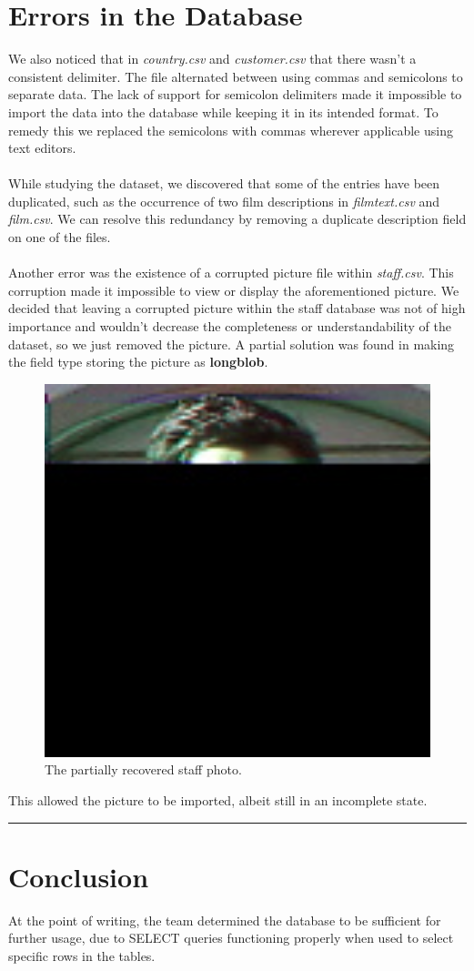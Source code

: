 \documentclass{article}
\begin{document}
\section{Errors in the Database}
	We also noticed that in \emph{country.csv} and \emph{customer.csv} that there wasn’t a consistent delimiter. The file alternated between using commas 
	and semicolons to separate data. The lack of support for semicolon delimiters made it impossible to import the data into the database while keeping it in its intended format. 
	To remedy this we replaced the semicolons with commas wherever applicable using text editors.
	\\\\
	While studying the dataset, we discovered that some of the entries have been duplicated, such as the occurrence of two film descriptions in \emph{film\textunderscore text.csv} and \emph{film.csv}. We can resolve this redundancy by removing a duplicate description field on one of the files.
	\\\\
	Another error was the existence of a corrupted picture file within \emph{staff.csv}. This corruption made it impossible to view or display the aforementioned picture. 
	We decided that leaving a corrupted picture within the staff database was not of high importance and wouldn’t decrease the completeness or understandability of the dataset,
	so we just removed the picture. A partial solution was found in making the field type storing the picture as \textbf{longblob}. 
	\begin{figure}[H]
		\includegraphics[width=13cm]{staff-picture}
		\caption{The partially recovered staff photo.}
	\end{figure}
	This allowed the picture to be imported, albeit still in an incomplete state. 
	\\
	\rule{\textwidth}{0.4pt}

\section{Conclusion}
	At the point of writing, the team determined the database to be sufficient for further usage, due to SELECT queries functioning properly when used to select specific rows in the tables.
\end{document}

